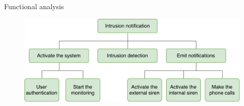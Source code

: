 \begin{frame}{Functional analysis}

  \begin{figure}[ht!]
    \centering
    \includegraphics[width=120mm]{images/functional_analysis.pdf}
    \label{fig:functional_analysis}
  \end{figure}

\end{frame}
